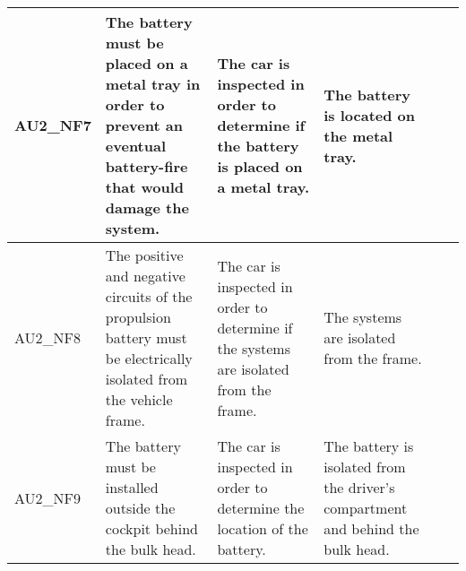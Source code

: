 \begin{longtable}{|p{1.7 cm}|p{2.9 cm}|p{2.9 cm}|p{1.9 cm}|p{1.8 cm}|p{1.8 cm}|}
	AU2\_NF7	& The battery must be placed on a metal tray in order to prevent an eventual battery-fire that would damage the system.
	& The car is inspected in order to determine if the battery is placed on a metal tray.
	& The battery is located on the metal tray.
	& 
	& \\ \hline
	AU2\_NF8 
	& The positive and negative circuits of the propulsion battery must be electrically isolated from the vehicle frame.
	& The car is inspected in order to determine if the systems are isolated from the frame.
	& The systems are isolated from the frame.
	& 
	& \\ \hline
	AU2\_NF9 
	& The battery must be installed outside the cockpit behind the bulk head.
	& The car is inspected in order to determine the location of the battery.
	& The battery is isolated from the driver's compartment and behind the bulk head. 
	& 
	& \\ \hline
\end{longtable}
